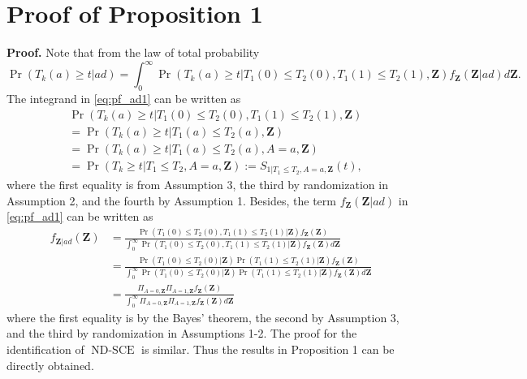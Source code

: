 \documentclass[12pt]{article}
\def\bfZ{\mathbf{Z}}
\def\Pr{\operatorname{Pr}}
\begin{document}
\section{Proof of Proposition 1}
\label{sec:proof}
\textbf{Proof.}
Note that from the law of total probability
\begin{equation}
\Pr(T_k(a)\geq t|ad) 
= \int_0^{\infty} \Pr(T_k(a)\geq t|T_1(0)\leq T_2(0), T_1(1)\leq T_2(1),\bfZ) f_{\bfZ}(\bfZ|ad)d\bfZ.
\label{eq:pf_ad1}
\end{equation}
The integrand in \eqref{eq:pf_ad1} can be written as
\begin{equation*}
\begin{split}
&\Pr(T_k(a)\geq t|T_1(0)\leq T_2(0),T_1(1)\leq T_2(1),\bfZ) \\
& =  \Pr(T_k(a)\geq t|T_1(a)\leq T_2(a),\bfZ) \\
& = \Pr(T_k(a)\geq t|T_1(a)\leq T_2(a),A=a,\bfZ) \\
& = \Pr(T_k\geq t|T_1\leq T_2,A=a,\bfZ) :=S_{1|T_1\leq T_2,A=a,\bfZ}(t),
\end{split}
\end{equation*}
where the first equality is from Assumption 3, the third by randomization in Assumption 2, and the fourth by Assumption 1. Besides, the term $f_{\bfZ}(\bfZ|ad)$ in \eqref{eq:pf_ad1} can be written as
\begin{equation*}
\begin{split}
f_{\bfZ|ad}(\bfZ) 
& =  \frac{\Pr( T_1(0)\leq T_2(0), T_1(1)\leq T_2(1)|\bfZ)f_{\bfZ}(\bfZ)}{\int_0^{\infty} \Pr( T_1(0)\leq T_2(0), T_1(1)\leq T_2(1)|\bfZ)f_{\bfZ}(\bfZ)d\bfZ}\\
& =  \frac{\Pr( T_1(0)\leq T_2(0)|\bfZ)\Pr( T_1(1)\leq T_2(1)|\bfZ)f_{\bfZ}(\bfZ)}{\int_0^{\infty} \Pr( T_1(0)\leq T_2(0)|\bfZ)\Pr( T_1(1)\leq T_2(1)|\bfZ)f_{\bfZ}(\bfZ)d\bfZ}\\
& = \frac{\Pi_{A=0,\bfZ}\Pi_{A=1,\bfZ}f_{\bfZ}(\bfZ)}{\int_0^{\infty} \Pi_{A=0,\bfZ}\Pi_{A=1,\bfZ}f_{\bfZ}(\bfZ)d\bfZ}
\end{split}
\end{equation*}
where the first equality is by the Bayes' theorem, the second by Assumption 3, and the third by randomization in Assumptions 1-2. The proof for the identification of $\operatorname{ND-SCE}$ is similar.
Thus the results in Proposition 1 can be directly obtained.
\end{document}
